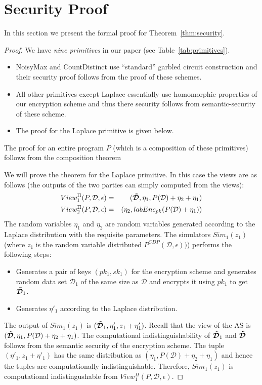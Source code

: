 \section{Security Proof}
In this section we present the formal proof for Theorem~\ref{thm:security}.
\begin{proof}
 We have {\it nine primitives} in our paper (see Table~\ref{tab:primitives}).
\begin{itemize}
\item \textsf{NoisyMax} and \textsf{CountDistinct} use
  ``standard'' garbled circuit construction and their security proof
  follows from the proof of these schemes.

\item All other primitives except \textsf{Laplace} essentially use 
homomorphic properties of our encryption scheme and thus there 
security follows from semantic-security of these scheme.

\item The proof for the \textsf{Laplace} primitive is given below.
\end{itemize}
The proof for an entire program $P$ (which is a composition 
of these primitives) follows from the composition theorem~\cite[Section 7.3.1]{Oded}

We will prove the theorem for the \textsf{Laplace} primitive.
In this case the views are as follows (the outputs of the
two parties can simply computed from the views):
\begin{eqnarray*}
View_1^{\Pi}(P,\mathcal{D},\epsilon) & = & (\boldsymbol{\tilde{\mathcal{D}}},\eta_1,P(\mathcal{D})+\eta_2+\eta_1) \\
View_2^{\Pi}(P,\mathcal{D},\epsilon) & = & (\eta_2,labEnc_{pk} (P(\mathcal{D})+\eta_1))
\end{eqnarray*}
The random variables $\eta_1$ and $\eta_2$ are random variables
generated according to the Laplace distribution with the requisite
parameters. The simulators $Sim_1 (z_1)$ (where $z_1$ is the random
variable distributed $P^{CDP}(\mathcal{D},\epsilon))$) performs the
following steps:
\begin{itemize}
\item Generates a pair of keys $(pk_1,sk_1)$ for the encryption scheme
  and generates random data set $\mathcal{D}_1$ of the same size as $\mathcal{D}$ and
  encrypts it using $pk_1$ to get $\boldsymbol{\tilde{\mathcal{D}}}_1$.

\item Generates $\eta'_1$ according to the Laplace distribution.
\end{itemize}
The output of $Sim_1 (z_1)$ is $(\boldsymbol{\tilde{\mathcal{D}}}_1,\eta'_1,z_1+\eta'_1)$.
Recall that the view of the \textsf{AS} is
$(\boldsymbol{\tilde{\mathcal{D}}},\eta_1,P(\mathcal{D})+\eta_2+\eta_1)$.  The computational
indistinguishability of $\boldsymbol{\tilde{\mathcal{D}}}_1$ and $\boldsymbol{\tilde{\mathcal{D}}}$ follows from the
semantic security of the encryption scheme. The tuple
$(\eta'_1,z_1+\eta'_1)$ has the same distribution as
$(\eta_1,P(\mathcal{D})+\eta_2+\eta_1)$ and hence the tuples are
computationally indistinguishable.  Therefore, $Sim_1 (z_1)$ is
computational indistingushable from $View_1^{\Pi}(P,\mathcal{D},\epsilon)$.



\end{proof}
